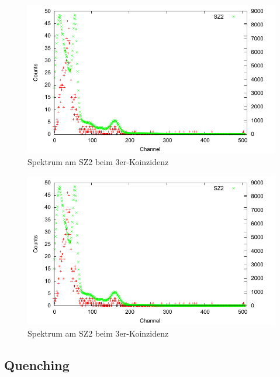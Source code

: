 \begin{figure}
 \includegraphics[width=\textwidth]{Graphen/3er/spektrum-1.pdf}
 \caption{Spektrum am SZ2 beim 3er-Koinzidenz}
\end{figure}

\begin{figure}
 \includegraphics[width=\textwidth]{Graphen/3er/spektrum-2.pdf}
 \caption{Spektrum am SZ2 beim 3er-Koinzidenz}
\end{figure}


\subsection{Quenching}